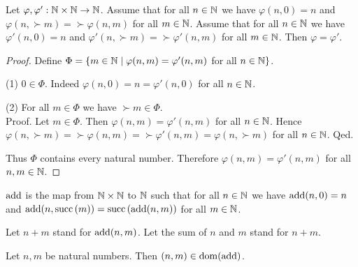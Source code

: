 \documentclass[../arithmetic.tex]{subfiles}
\begin{document}
  \begin{forthel}
    \begin{lemma}
      Let $\varphi, \varphi' : \mathbb{N} \times \mathbb{N} \to \mathbb{N}$.
      Assume that for all $n \in \mathbb{N}$ we have $\varphi(n,0) = n$ and
      $\varphi(n,\succ{m}) = \succ{\varphi(n,m)}$ for all $m \in \mathbb{N}$.
      Assume that for all $n \in \mathbb{N}$ we have $\varphi'(n,0) = n$ and
      $\varphi'(n,\succ{m}) = \succ{\varphi'(n,m)}$ for all $m \in \mathbb{N}$.
      Then $\varphi = \varphi'$.
    \end{lemma}
    \begin{proof}
      Define $\Phi = \{ m \in \mathbb{N} \mid \varphi(n,m) = \varphi'(n,m)$ for
      all $n \in \mathbb{N} \}$.

      (1) $0 \in \Phi$.
      Indeed $\varphi(n,0) = n = \varphi'(n,0)$ for all $n \in \mathbb{N}$.

      (2) For all $m \in \Phi$ we have $\succ{m} \in \Phi$. \\
      Proof.
        Let $m \in \Phi$.
        Then $\varphi(n,m) = \varphi'(n,m)$ for all $n \in \mathbb{N}$.
        Hence $\varphi(n, \succ{m})
          = \succ{\varphi(n,m)}
          = \succ{\varphi'(n,m)}
          = \varphi(n, \succ{m})$
        for all $n \in \mathbb{N}$.
      Qed.

      Thus $\Phi$ contains every natural number.
      Therefore $\varphi(n,m) = \varphi'(n,m)$ for all $n, m \in \mathbb{N}$.
    \end{proof}
  \end{forthel}

  \begin{forthel}
    \begin{definition}
      $\mathrm{add}$ is the map from $\mathbb{N} \times \mathbb{N}$ to $\mathbb{N}$ such that for all
      $n \in \mathbb{N}$ we have $\mathrm{add}(n,0) = n$ and $\mathrm{add}(n,\mathrm{succ}\left(m\right)) =
      \mathrm{succ}\left(\mathrm{add}(n,m)\right)$ for all $m \in \mathbb{N}$.
    \end{definition}

    Let $n \plus m$ stand for $\mathrm{add}(n,m)$.
    Let the sum of $n$ and $m$ stand for $n \plus m$.
  \end{forthel}

  \begin{forthel}
    \begin{lemma}
      Let $n, m$ be natural numbers.
      Then $(n,m) \in \operatorname{dom}(\mathrm{add})$.
    \end{lemma}
  \end{forthel}
\end{document}
